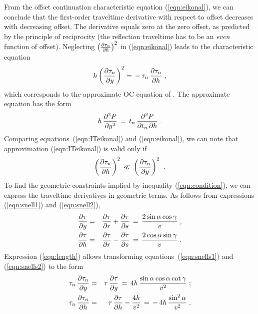 From the offset continuation characteristic equation
(\ref{eqn:eikonal}), we can conclude that the first-order traveltime
derivative with respect to offset decreases with decreasing
offset. The derivative equals zero at the zero offset, as predicted by the
principle of reciprocity (the reflection traveltime has to be an {\em
  even} function of offset). Neglecting $\left({\partial \tau_n} \over
  {\partial h}\right)^2$ in (\ref{eqn:eikonal}) leads to the
characteristic equation
\begin{equation}
 h \,   {\left( \partial \tau_n \over \partial y \right)}^2  
 = \, - \, \tau_n \, {\partial \tau_n \over \partial h}\;, 
\label{eqn:ITeikonal} 
\end{equation}
which corresponds to the approximate OC equation of
\cite{GPR30-06-08130828}. The approximate equation has the form
\begin{equation}
h \, {\partial^2 P \over \partial y^2} \, = \, t_n \, {\partial^2 P
\over {\partial t_n \, \partial h}}\;.
\label{eqn:bolondi} 
\end{equation}
Comparing equations~(\ref{eqn:ITeikonal}) and (\ref{eqn:eikonal}), we
can note that approximation (\ref{eqn:ITeikonal}) is valid only if
\begin{equation}
{\left( \partial \tau_n \over \partial h \right)}^2 \, \ll\, {\left(
\partial \tau_n \over \partial y \right)}^2 \,\,\,. 
\label{eqn:condition} 
\end{equation}
To find the geometric constraints implied by inequality
(\ref{eqn:condition}), we can express the traveltime derivatives in
geometric terms. As follows from expressions (\ref{eqn:snell1}) and
(\ref{eqn:snell2}),
\begin{eqnarray}
\label{eqn:snells1}
{{\partial \tau} \over {\partial y}} & = & {{\partial \tau} \over
{\partial r}} + {{\partial \tau} \over {\partial s}} \,=\, { {2
\sin{\alpha} \cos{\gamma}} \over {v}}\;, \\
{{\partial \tau} \over
{\partial h}} & = & {{\partial \tau} \over {\partial r}} - {{\partial
\tau} \over {\partial s}} \,=\, { {2 \cos{\alpha} \sin{\gamma}} \over
{v}}\;.
\label{eqn:snells2}
\end{eqnarray}
Expression (\ref{eqn:length}) allows transforming
equations~(\ref{eqn:snells1}) and (\ref{eqn:snells2}) to the form
\begin{eqnarray}
\label{eqn:connection1}
\tau_n \, {{\partial \tau_n} \over {\partial y}} & = & \tau \, {{\partial
\tau} \over {\partial y}} \,=\, 4h\,{{\sin{\alpha} \cos{\alpha}
\cot{\gamma}} \over {v^2}}\;; \\ 
\tau_n \, {{\partial \tau_n} \over {\partial h}} & = &\tau \, {{\partial
\tau} \over {\partial h}} - {{4h} \over {v^2}} \,=\,-\,
4h\,{{\sin^2{\alpha}} \over {v^2}}\;.   
\label{eqn:connection2} 
\end{eqnarray}
